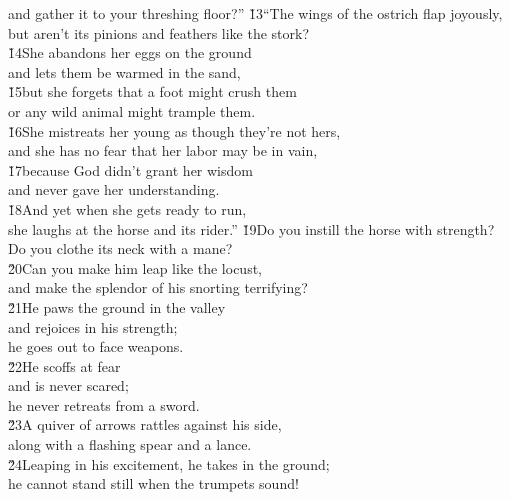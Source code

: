 \begin{poetry}
\poemll    and gather it to your threshing floor?''
\poeml \v{13}``The wings of the ostrich flap joyously, \\
\poemll    but aren't its pinions and feathers like the stork? \\
\poeml \v{14}She abandons her eggs on the ground \\
\poemll    and lets them be warmed in the sand, \\
\poeml \v{15}but she forgets that a foot might crush them \\
\poemll    or any wild animal might trample them. \\
\poeml \v{16}She mistreats her young as though they're not hers, \\
\poemll    and she has no fear that her labor may be in vain, \\
\poeml \v{17}because God didn't grant her wisdom \\
\poemll    and never gave her understanding. \\
\poeml \v{18}And yet when she gets ready to run, \\
\poemll    she laughs at the horse and its rider.''
\poeml \v{19}Do you instill the horse with strength? \\
\poemll    Do you clothe its neck with a mane? \\
\poeml \v{20}Can you make him leap like the locust, \\
\poemll    and make the splendor of his snorting terrifying? \\
\poeml \v{21}He paws the ground in the valley \\
\poemll    and rejoices in his strength; \\
\poemlll       he goes out to face weapons. \\
\poeml \v{22}He scoffs at fear \\
\poemll    and is never scared; \\
\poemlll       he never retreats from a sword. \\
\poeml \v{23}A quiver of arrows rattles against his side, \\
\poemll    along with a flashing spear and a lance. \\
\poeml \v{24}Leaping in his excitement, he takes in the ground; \\
\poemll    he cannot stand still when the trumpets sound! \\

\end{poetry}
